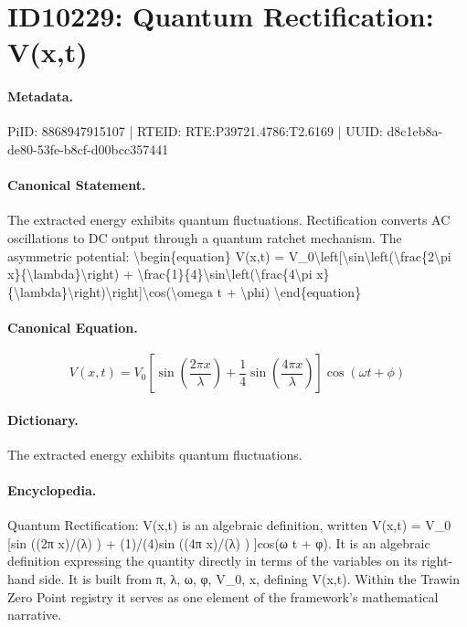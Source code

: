\section*{ID10229: Quantum Rectification: V(x,t)}
\paragraph{Metadata.}
PiID: 8868947915107 | RTEID: RTE:P39721.4786:T2.6169 | UUID: d8c1eb8a-de80-53fe-b8cf-d00bcc357441

\paragraph{Canonical Statement.}
The extracted energy exhibits quantum fluctuations. Rectification converts AC oscillations to DC output through a quantum ratchet mechanism. The asymmetric potential: \textbackslash{}begin\{equation\} V(x,t) = V\_0\textbackslash{}left[\textbackslash{}sin\textbackslash{}left(\textbackslash{}frac\{2\textbackslash{}pi x\}\{\textbackslash{}lambda\}\textbackslash{}right) + \textbackslash{}frac\{1\}\{4\}\textbackslash{}sin\textbackslash{}left(\textbackslash{}frac\{4\textbackslash{}pi x\}\{\textbackslash{}lambda\}\textbackslash{}right)\textbackslash{}right]\textbackslash{}cos(\textbackslash{}omega t + \textbackslash{}phi) \textbackslash{}end\{equation\}

\paragraph{Canonical Equation.}
\[
V(x,t) = V_0\left[\sin\left(\frac{2\pi x}{\lambda}\right) + \frac{1}{4}\sin\left(\frac{4\pi x}{\lambda}\right)\right]\cos(\omega t + \phi)
\]

\paragraph{Dictionary.}
The extracted energy exhibits quantum fluctuations.

\paragraph{Encyclopedia.}
Quantum Rectification: V(x,t) is an algebraic definition, written V(x,t) = V\_0 [sin ((2π x)/(λ) ) + (1)/(4)sin ((4π x)/(λ) ) ]cos(ω t + φ). It is an algebraic definition expressing the quantity directly in terms of the variables on its right-hand side. It is built from π, λ, ω, φ, V\_0, x, defining V(x,t). Within the Trawin Zero Point registry it serves as one element of the framework's mathematical narrative.
